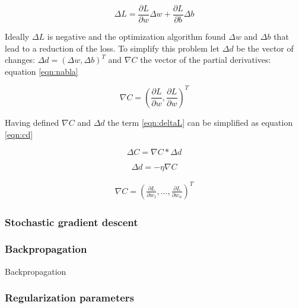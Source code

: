 \begin{equation}
  \Delta L = \frac{\partial L}{\partial w} \Delta w + \frac{\partial L}{\partial b} \Delta b
\label{eqn:deltaL}   
\end{equation}

Ideally $\Delta L$ is negative and the optimization algorithm found $\Delta w$ and $\Delta b$ that lead to a reduction of the loss. To simplify this problem let $\Delta d$ be the vector of changes: $\Delta d = (\Delta w ,  \Delta b)^T $ and $\nabla C$ the vector of the partial derivatives: equation \ref{eqn:nabla}

\begin{equation}
 \nabla C = \left(\frac{\partial L}{\partial w}, \frac{\partial L}{\partial w}\right)^T
\label{eqn:nabla}
\end{equation}

Having defined $\nabla C$ and $\Delta d$ the term \ref{eqn:deltaL} can be simplified as equation \ref{eqn:cd}

\begin{equation}
\Delta C = \nabla C * \Delta d
  \label{eqn:cd}
\end{equation}

\begin{equation}
  \Delta d = -\eta \nabla C
  \label{eqn:eta}
\end{equation}


\begin{eqnarray}
  \nabla C = \left(\frac{\partial L}{\partial w_1}, \ldots,
  \frac{\partial L}{\partial w_n}\right)^T
  \label{eqn:gd}
\end{eqnarray}


\subsubsection{Stochastic gradient descent}

\subsubsection{Backpropagation}

Backpropagation \cite{rumelhart1988learning}

\subsubsection{Regularization parameters}





